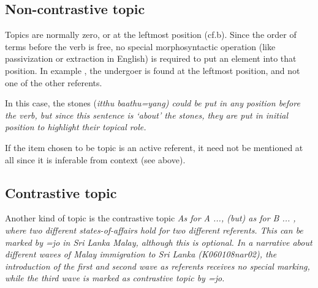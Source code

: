 \subsection{Non-contrastive topic}\label{sec:disc:Non-contrastivetopic}
Topics are normally zero, or at the leftmost position (cf.b). Since the order of terms before the verb is free, no special morphosyntactic operation (like passivization or extraction in English) is required to put an element into that position. In example , the undergoer  is found at the leftmost position, and not one of the other referents.



In this case, the stones (\em itthu baathu=yang\em) could be put in any position before the verb, but since this sentence is `about' the stones, they are put in initial position to highlight their topical role.

If the item chosen to be topic is an active referent, it need not be mentioned at all since it is inferable from context (see above).

\subsection{Contrastive topic}\label{sec:disc:Contrastivetopic}
Another kind of topic is the contrastive topic \em As for A ..., (but) as for B ... \em \citep[291]{Lambrecht1994}, where two different states-of-affairs hold for two different referents. This can be marked by \em =jo \em {} in Sri Lanka Malay, although this is optional.
In a narrative about different waves of Malay immigration to Sri Lanka (K060108nar02), the introduction of the first and second wave as referents receives no special marking, while the third wave is marked as contrastive topic by \em =jo\em.



